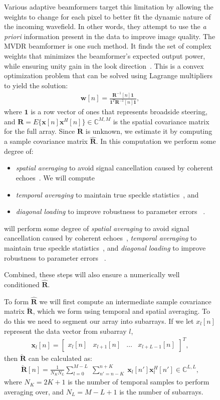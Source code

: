 \documentclass[12pt,journal,draftclsnofoot,onecolumn]{IEEEtran}
\newcommand\bmat[1]{\begin{bmatrix}#1\end{bmatrix}}
\newcommand\sumb[2]{\sum\limits_{#1}^{#2}\;}
\newcommand\T{^{\scriptscriptstyle T}}
\renewcommand\H{^{\scriptscriptstyle H}}
\renewcommand\vec[1]{\boldsymbol{#1}}
\newcommand\mat[1]{\boldsymbol{#1}}
\newcommand\1{\vec 1}
\newcommand*\x{\vec x}
\newcommand*\R{\mat R}
\newcommand*\Ri{\R^{-1}}
\newcommand*\eR{\mat{\hat R}}
\begin{document}
\begin{figure}[H]
Various adaptive beamformers target this limitation by allowing the weights to change for each pixel to better fit the dynamic nature of the incoming wavefield. In other words, they attempt to use the \emph{a priori} information present in the data to improve image quality. The MVDR beamformer is one such method. It finds the set of complex weights that minimizes the beamformer's expected output power, while ensuring unity gain in the look direction~\cite{Capon1969}. This is a convex optimization problem that can be solved using Lagrange multipliers to yield the solution:
\begin{gather}
\vec w[n] = \frac{\Ri[n]\1}{\1\T\Ri[n]\1},\label{weights}
\end{gather}
where $\1$ is a row vector of ones that represents broadside steering, and $\R=E\{\x[n]\x\H[n]\} \in\mathbb{C}^{M,M}$ is the spatial covariance matrix for the full array. Since $\R$ is unknown, we estimate it by computing a sample covariance matrix $\eR$. In this computation we perform some degree of:
\begin{itemize}
\item \emph{spatial averaging} to avoid signal cancellation caused by coherent echoes~\cite{Kailath1985}. We will compute 
\item \emph{temporal averaging} to maintain true speckle statistics~\cite{Synnevag2009a}, and
\item \emph{diagonal loading} to improve robustness to parameter errors ~\cite{Cox1987,Maksym1979}.
\end{itemize}

 will perform some degree of \emph{spatial averaging} to avoid signal cancellation caused by coherent echoes~\cite{Kailath1985}, \emph{temporal averaging} to maintain true speckle statistics~\cite{Synnevag2009a}, and \emph{diagonal loading} to improve robustness to parameter errors ~\cite{Cox1987,Maksym1979}. 




Combined, these steps will also ensure a numerically well conditioned $\eR$.

To form $\eR$ we will first compute an intermediate sample covariance matrix $\breve{\R}$, which we form using temporal and spatial averaging. To do this we need to segment our array into subarrays. If we let $x_l[n]$ represent the data vector from subarray $l$,
\begin{gather}
\x_l[n] = \bmat{x_l[n] & x_{l+1}[n] & \dots & x_{l+L-1}[n]}\T,
\end{gather}
then $\breve{\R}$ can be calculated as:
\begin{gather}
\breve{\R}[n] =  \frac{1}{N_K N_L} \sumb{l=0}{M-L}\sumb{n'=n-K}{n+K} \x_l[n']\x_l\H[n'] \in\mathbb{C}^{L,L},\label{spatialR}
\end{gather}
where $N_K = 2K+1$ is the number of temporal samples to perform averaging over, and $N_L = M-L+1$ is the number of subarrays.


\end{figure}
\end{document}
